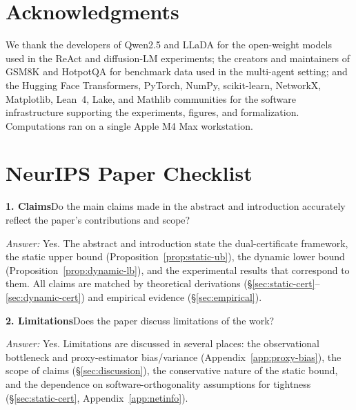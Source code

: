 \documentclass{article}
\begin{document}
\section*{Acknowledgments}

We thank the developers of Qwen2.5 and LLaDA for the open-weight models used in the ReAct and diffusion-LM experiments; the creators and maintainers of GSM8K and HotpotQA for benchmark data used in the multi-agent setting; and the Hugging Face Transformers, PyTorch, NumPy, scikit-learn, NetworkX, Matplotlib, Lean~4, Lake, and Mathlib communities for the software infrastructure supporting the experiments, figures, and formalization. Computations ran on a single Apple M4 Max workstation.




\section*{NeurIPS Paper Checklist}

\noindent\textbf{1. Claims}\quad Do the main claims made in the abstract and introduction accurately reflect the paper's contributions and scope?

\emph{Answer:} Yes. The abstract and introduction state the dual-certificate framework, the static upper bound (Proposition~\ref{prop:static-ub}), the dynamic lower bound (Proposition~\ref{prop:dynamic-lb}), and the experimental results that correspond to them. All claims are matched by theoretical derivations (\S\ref{sec:static-cert}--\ref{sec:dynamic-cert}) and empirical evidence (\S\ref{sec:empirical}).

\noindent\textbf{2. Limitations}\quad Does the paper discuss limitations of the work?

\emph{Answer:} Yes. Limitations are discussed in several places: the observational bottleneck and proxy-estimator bias/variance (Appendix~\ref{app:proxy-bias}), the scope of claims (\S\ref{sec:discussion}), the conservative nature of the static bound, and the dependence on software-orthogonality assumptions for tightness (\S\ref{sec:static-cert}, Appendix~\ref{app:netinfo}).
\end{document}
